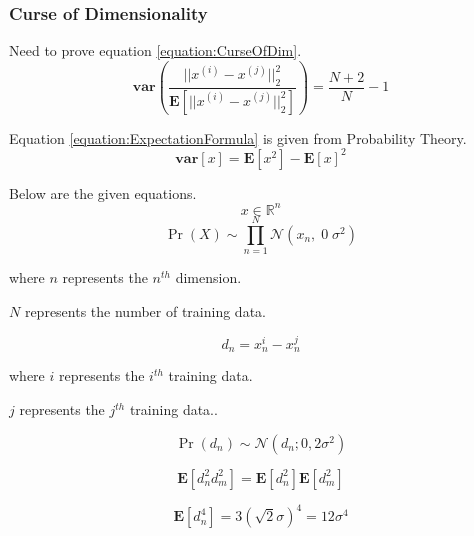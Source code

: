 \documentclass[a4paper,12pt]{article}
\begin{document}
\subsubsection{Curse of Dimensionality}

Need to prove equation \ref{equation:CurseOfDim}.
\begin{equation}
\label{equation:CurseOfDim}
\mathbf{var}(\frac{||x^{(i)} - x^{(j)}||_{2}^{2}}{\mathbf{E}[||x^{(i)} - x^{(j)}||_{2}^{2}] }) = \frac{N + 2}{N} - 1
\end{equation} 

Equation \ref{equation:ExpectationFormula} is given from  Probability Theory. 
\begin{equation}
\label{equation:ExpectationFormula}
\mathbf{var}[x] = \mathbf{E}[x^{2}] - \mathbf{E}[x]^{2}
\end{equation} 

Below are the given equations. 
\begin{equation}
x \in \mathbb{R}^{n}
\end{equation} 
\begin{equation}
\label{equation:GaussianDistribution}
\Pr(X) \sim \prod_{n=1}^{N} \mathcal{N}(x_{n},\; 0 \; \sigma^{2})
\end{equation} 
{\centering where $n$ represents the $n^{th}$ dimension. 

$N$ represents the number of training data. \par}

\begin{equation}
\label{equation:DifferenceGaussian}
d_{n} = x_{n}^{i} - x_{n}^{j}
\end{equation} 

{\centering where $i$ represents the $i^{th}$ training data. 

$j$ represents the $j^{th}$ training data.. \par}

\begin{equation}
\label{equation:DifferenceDistribution}
\Pr(d_{n}) \sim \mathcal{N}(d_{n} ; 0 , 2\sigma^{2})
\end{equation} 

\begin{equation}
\label{equation:IndependentDifference}
\mathbf{E}[d_{n}^{2}d_{m}^{2}] = \mathbf{E}[d_{n}^{2}]\mathbf{E}[d_{m}^{2}]
\end{equation}

\begin{equation}
\label{equation:FourthMoment}
\mathbf{E}[d_{n}^{4}] = 3(\sqrt{2}\sigma)^{4} = 12\sigma^{4}
\end{equation} 
\end{document}
